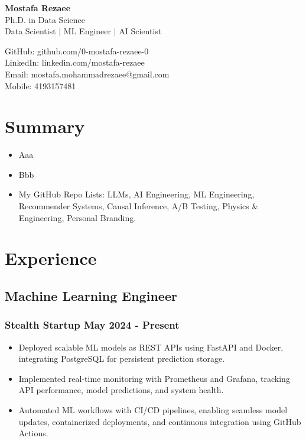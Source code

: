 \documentclass[11pt]{article} %
\begin{document}
\begin{center}
	\begin{minipage}{0.45\textwidth}
		{\Huge\bfseries
			Mostafa Rezaee  %
		} \\ \medskip
		Ph.D. in Data Science \\ %
		Data Scientist $|$ ML Engineer $|$ AI Scientist 
	\end{minipage} \hfill
	\begin{minipage}{0.48\textwidth}
		GitHub: github.com/0-mostafa-rezaee-0 \\
		LinkedIn: linkedin.com/mostafa-rezaee \\
		Email: mostafa.mohammadrezaee@gmail.com \\
		Mobile: 4193157481
	\end{minipage}
\end{center}

\section{Summary}
\begin{itemize}
	\item Aaa
	\item Bbb
	\item My GitHub Repo Lists: LLMs, AI Engineering, ML Engineering, Recommender Systems, Causal Inference, A/B Testing, Physics \& Engineering, Personal Branding.
\end{itemize}

\section{Experience}
\subsection{Machine Learning Engineer}
\subsubsection{Stealth Startup \hfill May 2024 - Present}
\begin{itemize}
	\item Deployed scalable ML models as REST APIs using FastAPI and Docker, integrating PostgreSQL for persistent prediction storage.
	\item Implemented real-time monitoring with Prometheus and Grafana, tracking API performance, model predictions, and system health. 
	\item Automated ML workflows with CI/CD pipelines, enabling seamless model updates, containerized deployments, and continuous integration using GitHub Actions.
\end{itemize}
\end{document}
